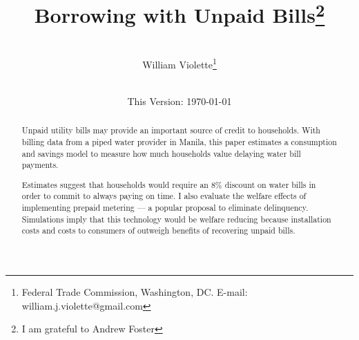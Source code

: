 \documentclass[12pt]{article}
\begin{document}
\begin{titlepage} 
\title{{Borrowing with Unpaid Bills}\thanks{I am grateful to Andrew Foster}}
\author{\\[3em]
  William Violette\thanks{Federal Trade Commission, Washington, DC. E-mail: william.j.violette@gmail.com} \\
 \\ 
  }
\vspace{30mm}
\date{\vspace{5mm}This Version: \today}
\maketitle
\begin{abstract}





Unpaid utility bills may provide an important source of credit to households.  With billing data from a piped water provider in Manila, this paper estimates a consumption and savings model to measure how much households value delaying water bill payments. 


 Estimates suggest that households would require an 8\% discount on water bills in order to commit to always paying  on time.  I also evaluate the welfare effects of implementing prepaid metering --- a popular proposal to eliminate delinquency.  Simulations imply that this technology would be welfare reducing because installation costs and costs to consumers of outweigh benefits of recovering unpaid bills.   






\end{abstract}
\end{titlepage}
\end{document}
